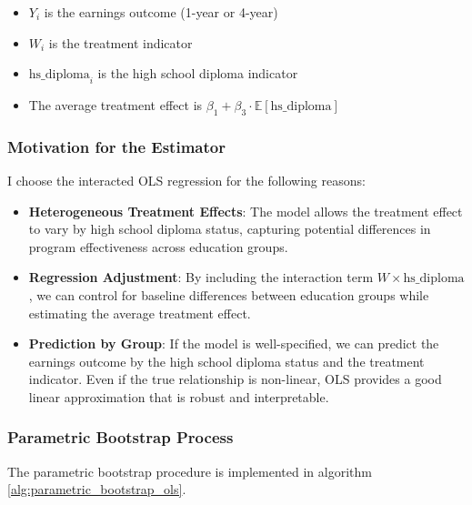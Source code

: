 \documentclass[11pt]{article}
\numberwithin{equation}{section}
\begin{document}
\begin{itemize}
    \item $Y_i$ is the earnings outcome (1-year or 4-year)
    \item $W_i$ is the treatment indicator
    \item $\text{hs\_diploma}_i$ is the high school diploma indicator
    \item The average treatment effect is $\beta_1 + \beta_3 \cdot \mathbb{E}[\text{hs\_diploma}]$
\end{itemize}

\subsubsection{Motivation for the Estimator}

I choose the interacted OLS regression for the following reasons:

\begin{itemize}
    \item \textbf{Heterogeneous Treatment Effects}: The model allows the treatment effect to vary by high school diploma status, capturing potential differences in program effectiveness across education groups.
    
    \item \textbf{Regression Adjustment}: By including the interaction term $W \times \text{hs\_diploma}$, we can control for baseline differences between education groups while estimating the average treatment effect.
    
    \item \textbf{Prediction by Group}: If the model is well-specified, we can predict the earnings outcome by the high school diploma status and the treatment indicator. Even if the true relationship is non-linear, OLS provides a good linear approximation that is robust and interpretable.
\end{itemize}



\subsubsection{Parametric Bootstrap Process}

The parametric bootstrap procedure is implemented in algorithm \ref{alg:parametric_bootstrap_ols}.
\end{document}

